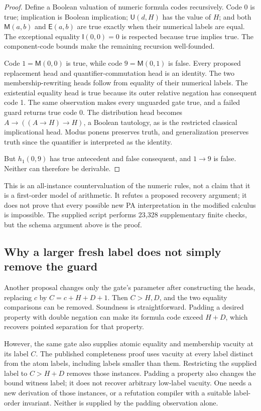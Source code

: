 \documentclass[11pt,letterpaper]{article}
\newcommand{\I}{\mathsf I}
\newcommand{\M}{\mathsf M}
\newcommand{\U}{\mathsf U}
\newcommand{\E}{\mathsf E}
\begin{document}
\begin{proof}
Define a Boolean valuation of numeric formula codes recursively.
Code 0 is true; implication is Boolean implication;
$\U(d,H)$ has the value of $H$; and both $\M(a,b)$ and $\E(a,b)$
are true exactly when their numerical labels are equal.
The exceptional equality $\I(0,0)=0$ is respected because
true implies true. The component-code bounds make the remaining recursion
well-founded.

Code $1=\M(0,0)$ is true, while code $9=\M(0,1)$ is false.
Every proposed replacement head and quantifier-commutation head is an
identity. The two membership-rewriting heads follow from equality of
their numerical labels. The existential equality head is true because
its outer relative negation has consequent code 1. The same observation
makes every unguarded gate true, and a failed guard returns true code 0.
The distribution head becomes
$A\to((A\to H)\to H)$, a Boolean tautology, as is the restricted
classical implicational head. Modus ponens preserves truth, and
generalization preserves truth since the quantifier is interpreted as
the identity.

But $h_1(0,9)$ has true antecedent and false consequent, and $1\to9$
is false. Neither can therefore be derivable.
\end{proof}

This is an all-instance countervaluation of the numeric rules, not a
claim that it is a first-order model of arithmetic. It refutes a proposed
recovery argument; it does not prove that every possible new PA
interpretation in the modified calculus is impossible. The supplied
script performs 23,328 supplementary finite checks, but the schema
argument above is the proof.

\subsection{Why a larger fresh label does not simply remove the guard}

Another proposal changes only the gate's parameter after constructing
the heads, replacing $c$ by $C=c+H+D+1$. Then $C>H,D$, and the
two equality comparisons can be removed. Soundness is straightforward.
Padding a desired property with double negation can make its formula
code exceed $H+D$, which recovers pointed separation for that property.

However, the same gate also supplies atomic equality and membership
vacuity at its label $C$. The published completeness proof uses vacuity
at every label distinct from the atom labels, including labels smaller
than them. Restricting the supplied label to $C>H+D$ removes those
instances. Padding a property also changes the bound witness label; it
does not recover arbitrary low-label vacuity. One needs a new derivation
of those instances, or a refutation compiler with a suitable label-order
invariant. Neither is supplied by the padding observation alone.
\end{document}
